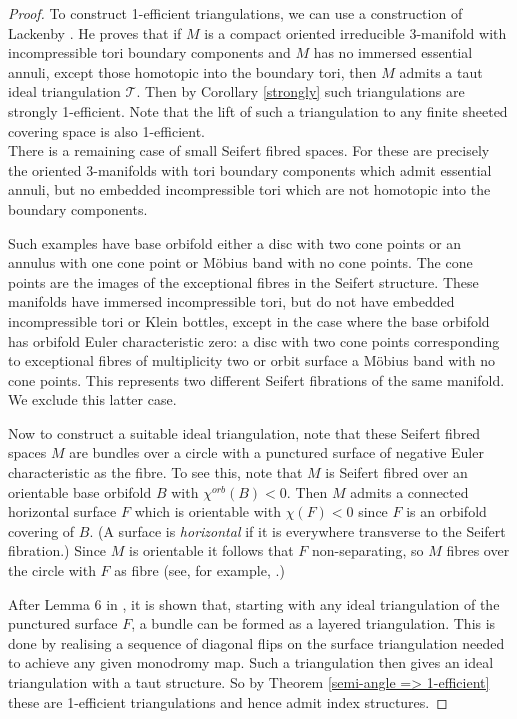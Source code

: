 \documentclass[12pt]{amsart}
\theoremstyle{definition}
\theoremstyle{remark}
\def\tri{\mathcal{T}}
\begin{document}
\begin{proof}
To construct 1-efficient triangulations, we can use a construction of Lackenby \cite{Lackenby2}. 
He proves that if $M$ is a compact oriented irreducible 3-manifold with incompressible tori boundary components and $M$ has no immersed essential annuli, except those homotopic into the boundary tori, then $M$ admits a taut ideal triangulation $\tri$.
Then by Corollary \ref{strongly}
such triangulations are strongly 1-efficient.  Note that the lift of such a triangulation to any finite sheeted covering space is also 1-efficient. \\

There is a remaining case of small Seifert fibred spaces. For these are precisely the oriented $3$-manifolds with tori boundary components which admit essential annuli, but no embedded incompressible tori which are not homotopic into the boundary components. 

Such examples have 
base orbifold either a disc with two cone points or an annulus with one cone point or  M\"obius band with no cone points. The cone points are the images of the exceptional fibres in the Seifert structure. These manifolds have immersed incompressible tori, but do not have embedded incompressible tori or Klein bottles, except in the case where the base orbifold has orbifold Euler characteristic zero: a disc with two cone points corresponding to exceptional fibres of multiplicity two or orbit surface a M\"obius band with no cone points. This represents two different Seifert fibrations of the same manifold. We exclude this latter case. 

Now to construct a suitable ideal triangulation, note that these Seifert fibred spaces $M$ are bundles over a circle with a punctured surface of negative Euler characteristic as the fibre. To see this, note that $M$ is Seifert fibred over an orientable base orbifold $B$ with $\chi^{orb}(B)<0$. Then $M$ admits a connected horizontal surface $F$ which is orientable with $\chi(F)<0$ since $F$ is an orbifold covering of $B$. (A surface is \emph{horizontal} if it is everywhere transverse to the Seifert fibration.) Since $M$ is orientable it follows that $F$ non-separating, so $M$ fibres over the circle with $F$ as fibre (see, for example, \cite[sections 1.2 and 2.1]{Hat}.) 

After Lemma 6 in \cite{Lackenby2}, it is shown that, starting with any ideal triangulation of the punctured surface $F$, a bundle can be formed as a layered triangulation. This is done by realising a sequence of diagonal flips on the surface triangulation needed to achieve any given monodromy map. Such a triangulation then gives an ideal triangulation with a taut structure. So by Theorem \ref{semi-angle => 1-efficient} these are 1-efficient triangulations and hence admit index structures. \end{proof}
\end{document}
